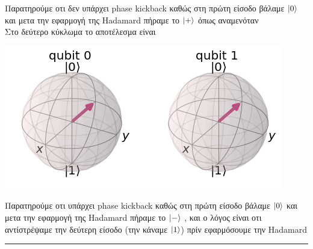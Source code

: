\documentclass[12pt]{article}
\begin{document}
Παρατηρούμε οτι δεν υπάρχει \textlatin{phase kickback} καθώς στη πρώτη είσοδο βάλαμε $\ket{0}$ και μετα την εφαρμογή της \textlatin{Hadamard} πήραμε το $\ket{+}$ όπως αναμενόταν \\ 
Στο δεύτερο κύκλωμα το αποτέλεσμα είναι 
\begin{center}
    \includegraphics[]{phasekickback.png}
\end{center}


Παρατηρούμε οτι υπάρχει \textlatin{phase kickback} καθώς στη πρώτη είσοδο βάλαμε $\ket{0}$ και μετα την εφαρμογή της \textlatin{Hadamard} πήραμε το $\ket{-}$ , και ο λόγος είναι οτι αντίστρέψαμε την δεύτερη είσοδο (την κάναμε $\ket{1}$) πρίν εφαρμόσουμε την \textlatin{Hadamard}\\
\rule{\textwidth}{.5pt}

\end{document}
